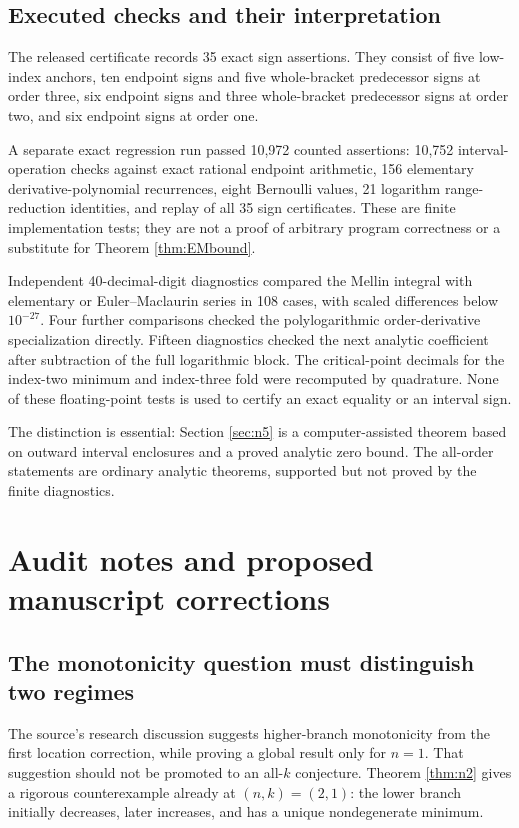 \documentclass[11pt]{article}
\numberwithin{equation}{section}
\theoremstyle{definition}\newtheorem{definition}[theorem]{Definition}
\theoremstyle{remark}\newtheorem{remark}[theorem]{Remark}
\begin{document}
\subsection{Executed checks and their interpretation}
The released certificate records 35 exact sign assertions. They consist of five low-index anchors, ten endpoint signs and five whole-bracket predecessor signs at order three, six endpoint signs and three whole-bracket predecessor signs at order two, and six endpoint signs at order one.

A separate exact regression run passed 10,972 counted assertions: 10,752 interval-operation checks against exact rational endpoint arithmetic, 156 elementary derivative-polynomial recurrences, eight Bernoulli values, 21 logarithm range-reduction identities, and replay of all 35 sign certificates. These are finite implementation tests; they are not a proof of arbitrary program correctness or a substitute for Theorem \ref{thm:EMbound}.

Independent 40-decimal-digit diagnostics compared the Mellin integral with elementary or Euler--Maclaurin series in 108 cases, with scaled differences below $10^{-27}$. Four further comparisons checked the polylogarithmic order-derivative specialization directly. Fifteen diagnostics checked the next analytic coefficient after subtraction of the full logarithmic block. The critical-point decimals for the index-two minimum and index-three fold were recomputed by quadrature. None of these floating-point tests is used to certify an exact equality or an interval sign.

The distinction is essential: Section \ref{sec:n5} is a computer-assisted theorem based on outward interval enclosures and a proved analytic zero bound. The all-order statements are ordinary analytic theorems, supported but not proved by the finite diagnostics.

\section{Audit notes and proposed manuscript corrections}\label{sec:audit}
\subsection{The monotonicity question must distinguish two regimes}
The source's research discussion suggests higher-branch monotonicity from the first location correction, while proving a global result only for $n=1$. That suggestion should not be promoted to an all-$k$ conjecture. Theorem \ref{thm:n2} gives a rigorous counterexample already at $(n,k)=(2,1)$: the lower branch initially decreases, later increases, and has a unique nondegenerate minimum.
\end{document}
